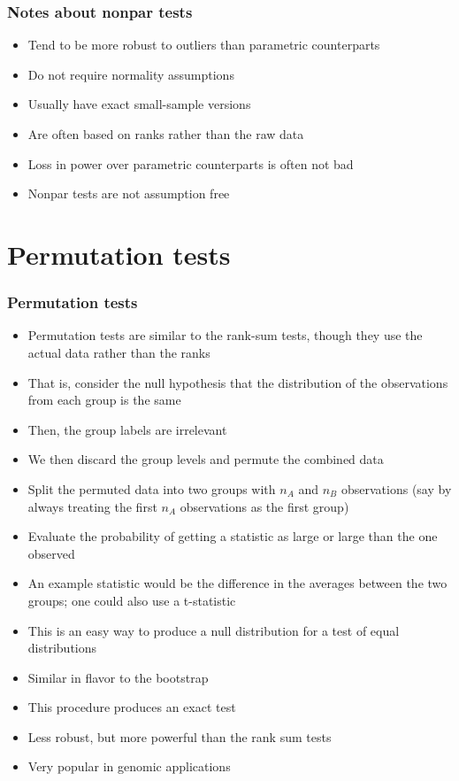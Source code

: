 \documentclass[aspectratio=169]{beamer}
\begin{document}
\begin{frame}\frametitle{Notes about nonpar tests}
\begin{itemize}
\item Tend to be more robust to outliers than parametric counterparts
\item Do not require normality assumptions
\item Usually have exact small-sample versions
\item Are often based on ranks rather than the raw data
\item Loss in power over parametric counterparts is often not bad
\item Nonpar tests are not assumption free
\end{itemize}
\end{frame}

\section{Permutation tests}
\begin{frame}\frametitle{Permutation tests}
  \begin{itemize}
  \item Permutation tests are similar to the rank-sum tests, though they use the
    actual data rather than the ranks
  \item That is, consider the null hypothesis that the distribution of the
    observations from each group is the same
  \item Then, the group labels are irrelevant
  \item We then discard the group levels and permute the combined data
  \item Split the permuted data into two groups with $n_A$ and $n_B$
    observations (say by always treating the first $n_A$ observations as
    the first group)
  \item Evaluate the probability of getting a statistic as large or
    large than the one observed
  \item An example statistic would be the difference in the averages between the two groups;
    one could also use a t-statistic 
  \end{itemize}
\end{frame}

\begin{frame}
  \begin{itemize}
  \item This is an easy way to produce a null distribution for a test of equal distributions
  \item Similar in flavor to the bootstrap
  \item This procedure produces an exact test
  \item Less robust, but more powerful than the rank sum tests
  \item Very popular in genomic applications
  \end{itemize}
\end{frame}
\end{document}
